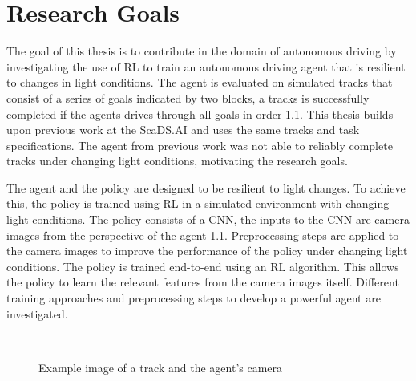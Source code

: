 \chapter{Research Goals}
\label{cha:ResearchGoals}

The goal of this thesis is to contribute in the domain of autonomous driving by investigating the use of \ac{RL} to train an autonomous driving agent that is resilient to changes in light conditions. The agent is evaluated on simulated tracks that consist of a series of goals indicated by two blocks, a tracks is successfully completed if the agents drives through all goals in order \ref{fig:track_and_agent}.
This thesis builds upon previous work at the ScaDS.AI \textcite{maximilian} and uses the same tracks and task specifications. The agent from previous work was not able to reliably complete tracks under changing light conditions, motivating the research goals.


The agent and the policy are designed to be resilient to light changes. To achieve this, the policy is trained using \ac{RL} in a simulated environment with changing light conditions. The policy consists of a \ac{CNN}, the inputs to the \ac{CNN} are camera images from the perspective of the agent \ref{fig:track_and_agent}. Preprocessing steps are applied to the camera images to improve the performance of the policy under changing light conditions. The policy is trained end-to-end using an \ac{RL} algorithm. This allows the policy to learn the relevant features from the camera images itself.
Different training approaches and preprocessing steps to develop a powerful agent are investigated.


\begin{figure}
    \centering
    \qquad
    \\
    \caption{Example image of a track and the agent's camera}
    \label{fig:track_and_agent}
\end{figure}


